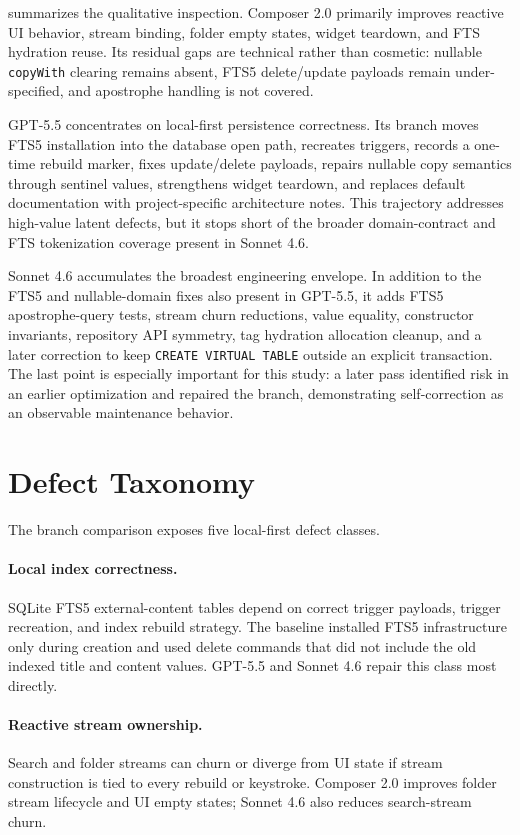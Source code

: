 \documentclass[11pt]{article}
\newcommand{\ComposerLabel}{Composer 2.0}
\newcommand{\GPTLabel}{GPT-5.5}
\newcommand{\SonnetLabel}{Sonnet 4.6}
\begin{document}
 summarizes the qualitative inspection. \ComposerLabel{} primarily improves reactive UI behavior, stream binding, folder empty states, widget teardown, and FTS hydration reuse. Its residual gaps are technical rather than cosmetic: nullable \texttt{copyWith} clearing remains absent, FTS5 delete/update payloads remain under-specified, and apostrophe handling is not covered.

\GPTLabel{} concentrates on local-first persistence correctness. Its branch moves FTS5 installation into the database open path, recreates triggers, records a one-time rebuild marker, fixes update/delete payloads, repairs nullable copy semantics through sentinel values, strengthens widget teardown, and replaces default documentation with project-specific architecture notes. This trajectory addresses high-value latent defects, but it stops short of the broader domain-contract and FTS tokenization coverage present in \SonnetLabel{}.

\SonnetLabel{} accumulates the broadest engineering envelope. In addition to the FTS5 and nullable-domain fixes also present in \GPTLabel{}, it adds FTS5 apostrophe-query tests, stream churn reductions, value equality, constructor invariants, repository API symmetry, tag hydration allocation cleanup, and a later correction to keep \texttt{CREATE VIRTUAL TABLE} outside an explicit transaction. The last point is especially important for this study: a later pass identified risk in an earlier optimization and repaired the branch, demonstrating self-correction as an observable maintenance behavior.

\section{Defect Taxonomy}
\label{sec:defect-taxonomy}

The branch comparison exposes five local-first defect classes.

\paragraph{Local index correctness.}
SQLite FTS5 external-content tables depend on correct trigger payloads, trigger recreation, and index rebuild strategy. The baseline installed FTS5 infrastructure only during creation and used delete commands that did not include the old indexed title and content values. \GPTLabel{} and \SonnetLabel{} repair this class most directly.

\paragraph{Reactive stream ownership.}
Search and folder streams can churn or diverge from UI state if stream construction is tied to every rebuild or keystroke. \ComposerLabel{} improves folder stream lifecycle and UI empty states; \SonnetLabel{} also reduces search-stream churn.
\end{document}
